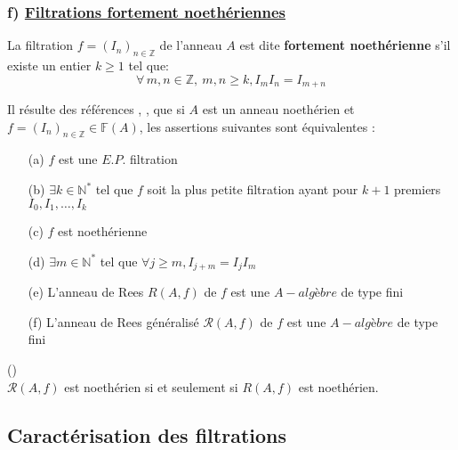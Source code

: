 \subsubsection{f) \underline{Filtrations fortement noethériennes}}
\begin{madefinition}
	La filtration $f = (I_n)_{n \in \mathbb{Z}}$ de l'anneau $A$ est dite \textbf{fortement noethérienne} s'il existe un entier $k \geqslant 1$ tel que:
	\[ \forall \, m, n \in \mathbb{Z}, \ m, n \geqslant k, I_m I_n = I_{m+n} \]
\end{madefinition}
\begin{maremarque}
	Il résulte des références \cite{Di1} , \cite{Di3}, \cite{Di4} que si $A$ est un anneau noethérien et $f=(I_n)_{n \in \mathbb{Z}} \in \mathbb{F}(A)$, les assertions suivantes sont équivalentes : 
	\begin{enumerate}
		\item[(a)] $f$ est une $E.P.$ filtration
		\item[(b)] $\exists k \in \mathbb{N}^{*}$ tel que $f$ soit la plus petite filtration ayant pour $k+1$ premiers $I_0, I_1,\dots, I_k $
		\item[(c)] $f$ est noethérienne
		\item[(d)] $\exists m \in \mathbb{N}^{*}$ tel que $\forall j \geqslant m, I_{j+m} = I_{j}I_{m}$
		\item[(e)] L'anneau de Rees $R(A,f)$ de $f$ est une $A-algèbre$ de type fini
		\item[(f)] L'anneau de Rees généralisé $\mathcal{R}(A,f)$ de $f$ est une $A-algèbre$ de type fini
	\end{enumerate}
\end{maremarque}
\begin{maremarque}(\cite{Di3})\\
	$\mathcal{R}(A,f)$ est noethérien si et seulement si $R(A,f)$ est noethérien.
\end{maremarque}

\subsection{Caractérisation des filtrations}
